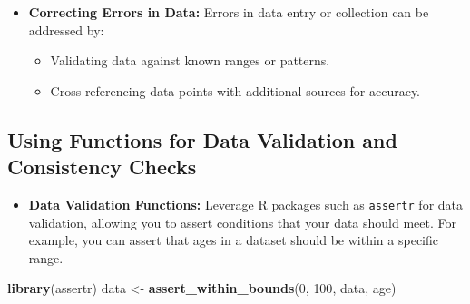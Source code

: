 \documentclass[
]{book}
\newenvironment{Shaded}{\begin{snugshade}}{\end{snugshade}}
\newcommand{\CommentTok}[1]{\textcolor[rgb]{0.56,0.35,0.01}{\textit{#1}}}
\newcommand{\DecValTok}[1]{\textcolor[rgb]{0.00,0.00,0.81}{#1}}
\newcommand{\FunctionTok}[1]{\textcolor[rgb]{0.13,0.29,0.53}{\textbf{#1}}}
\newcommand{\NormalTok}[1]{#1}
\newcommand{\OtherTok}[1]{\textcolor[rgb]{0.56,0.35,0.01}{#1}}
\newcommand{\SpecialCharTok}[1]{\textcolor[rgb]{0.81,0.36,0.00}{\textbf{#1}}}
\providecommand{\tightlist}{%
  \setlength{\itemsep}{0pt}\setlength{\parskip}{0pt}}
\begin{document}
\begin{itemize}
\item
  \textbf{Correcting Errors in Data:} Errors in data entry or collection can be addressed by:

  \begin{itemize}
  \tightlist
  \item
    Validating data against known ranges or patterns.
  \item
    Cross-referencing data points with additional sources for accuracy.
  \end{itemize}
\end{itemize}

\begin{Shaded}
\end{Shaded}

\hypertarget{using-functions-for-data-validation-and-consistency-checks}{%
\subsection*{Using Functions for Data Validation and Consistency Checks}\label{using-functions-for-data-validation-and-consistency-checks}}

\begin{itemize}
\tightlist
\item
  \textbf{Data Validation Functions:} Leverage R packages such as \texttt{assertr} for data validation, allowing you to assert conditions that your data should meet. For example, you can assert that ages in a dataset should be within a specific range.
\end{itemize}

\begin{Shaded}
\begin{Highlighting}[]
\FunctionTok{library}\NormalTok{(assertr)}
\NormalTok{data }\OtherTok{\textless{}{-}} \FunctionTok{assert\_within\_bounds}\NormalTok{(}\DecValTok{0}\NormalTok{, }\DecValTok{100}\NormalTok{, data, age)}
\end{Highlighting}
\end{Shaded}
\end{document}
